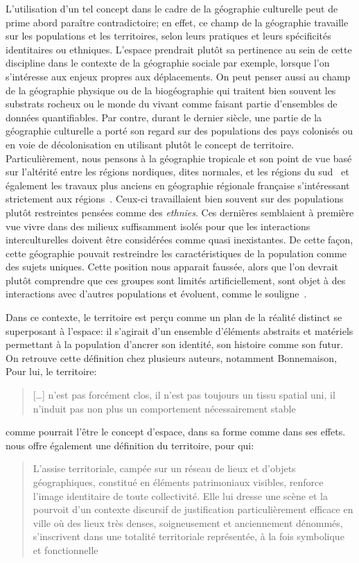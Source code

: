 L'utilisation d'un tel concept dans le cadre de la géographie culturelle peut de prime abord paraître contradictoire; en effet, ce champ de la géographie travaille  sur les populations et les territoires, selon leurs pratiques et leurs spécificités identitaires ou ethniques.
L'espace prendrait plutôt sa pertinence au sein de cette discipline dans le contexte de la géographie sociale par exemple, lorsque l'on s'intéresse aux enjeux propres aux déplacements.
On peut penser aussi au champ de la géographie physique ou de la biogéographie qui traitent bien souvent les substrats rocheux ou le monde du vivant comme faisant partie d'ensembles de données quantifiables.
Par contre, durant le dernier siècle, une partie de la géographie culturelle a porté son regard sur des populations des pays colonisés ou en voie de décolonisation en utilisant plutôt le concept de territoire.
Particulièrement, nous pensons à la géographie tropicale et son point de vue basé sur l'altérité entre les régions nordiques, dites normales, et les régions du sud~\citep[493]{Power2009} et également les travaux plus anciens en géographie régionale française s'intéressant strictement aux régions~\citep[31]{Courville1991}.
Ceux-ci travaillaient bien souvent sur des populations plutôt restreintes pensées comme des \emph{ethnies}.
Ces dernières semblaient à première vue vivre dans des milieux suffisamment isolés pour que les interactions interculturelles doivent être considérées comme quasi inexistantes.
De cette façon, cette géographie pouvait restreindre les caractéristiques de la population comme des sujets uniques.
Cette position nous apparait faussée, alors que l'on devrait plutôt comprendre que ces groupes sont limités artificiellement, sont objet à des interactions avec d'autres populations et évoluent,  comme le souligne~\citet[79--80]{DiMeo2007}.

Dans ce contexte, le territoire est perçu comme un plan de la réalité distinct se superposant à l'espace: il s'agirait d'un ensemble d'éléments abstraits et matériels permettant à la population d'ancrer son identité, son histoire comme son futur.
On retrouve cette définition chez plusieurs auteurs, notamment Bonnemaison,
Pour lui, le territoire:
\blockquote[{\cite[253]{Bonnemaison1981}}][]{[\ldots] n'est pas forcément clos, il n'est pas toujours un tissu spatial uni, il n'induit pas non plus un comportement nécessairement stable} comme pourrait l'être le concept d'espace, dans sa forme comme dans ses effets.
\citeauthor{DiMeo2007} nous offre également une définition du territoire, pour qui:
\blockquote[{\cite[76]{DiMeo2007}}][.]{L’assise territoriale, campée sur un réseau de lieux et d’objets géographiques, constitué en éléments patrimoniaux visibles, renforce l’image identitaire de toute collectivité. Elle lui dresse une scène et la pourvoit d’un contexte discursif de justification particulièrement efficace en ville où des lieux très denses, soigneusement et anciennement dénommés, s’inscrivent dans une totalité territoriale représentée, à la fois symbolique et fonctionnelle}.

